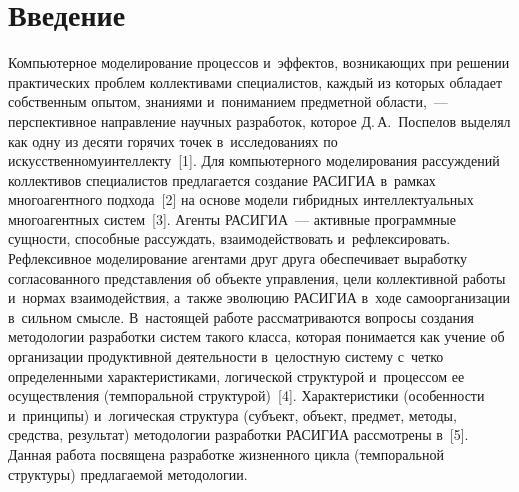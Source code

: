 


\thispagestyle{headings}

\begin{multicols}{2}

\label{st\stat}

\section{Введение}

  Компьютерное моделирование процессов и~эффектов, возникающих при 
решении практических проблем коллективами специалистов, каждый из 
которых обладает собственным опытом, знаниями и~пониманием предметной 
области,~--- перспективное на\-прав\-ле\-ние научных разработок, которое 
Д.\,А.~Поспелов выделял как одну из десяти горячих точек в~исследованиях по 
искусственному\linebreak интеллекту~[1]. Для компьютерного моделирования 
рас\-суж\-де\-ний коллективов специалистов предлагается создание \mbox{РАСИГИА} 
в~рамках многоагентного подхода~[2] на основе модели 
\mbox{ги\-брид\-ных} интеллектуальных многоагентных сис\-тем~[3]. Агенты 
\mbox{РАСИГИА}~--- активные программные сущности, способные 
рас\-суж\-дать, взаимодействовать и~рефлексировать. Рефлексивное 
моделирование агентами друг друга обеспечивает выработку согласованного 
пред\-став\-ле\-ния об объекте управ\-ле\-ния, \mbox{цели} коллективной работы и~нормах 
взаимодействия, а~также эволюцию \mbox{РАСИГИА} в~ходе 
самоорганизации в~сильном смыс\-ле. В~на\-сто\-ящей работе рас\-смат\-ри\-ва\-ют\-ся 
вопросы создания методологии разработки сис\-тем такого класса, которая 
понимается как учение об организации продуктивной де\-я\-тель\-ности 
в~це\-лост\-ную сис\-те\-му с~чет\-ко определенными характеристиками, логической 
структурой и~процессом ее осуществления (темпоральной структурой)~[4]. 
Характеристики (особенности и~принципы) и~логическая структура (субъект, 
объект, предмет, методы, средства, результат) методологии разработки 
\mbox{РАСИГИА} рас\-смот\-ре\-ны в~[5]. Данная работа по\-свя\-ще\-на разработке 
жизненного цик\-ла (темпоральной структуры) предлагаемой методологии.

\begin{figure*} %
\vspace*{1pt}
      \begin{center}
     \mbox{%
\epsfxsize=148.855mm 
}
\end{center}


\end{figure*}
\end{multicols}
